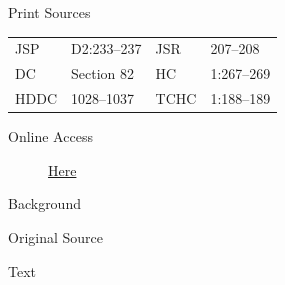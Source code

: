 			\begin{description}
				\item[Print Sources]
			\end{description}

				\begin{tabular}{p{0.5in}p{1in}p{0.5in}p{1in}}
				JSP	 	& D2:233--237	& JSR 		& 207--208 \\
				DC	 	& Section 82 	& HC 		& 1:267--269 \\
				HDDC 	& 1028--1037	& TCHC 		& 1:188--189 \\
				\end{tabular}
			
			\begin{description}
				\item[Online Access] \href{https://www.josephsmithpapers.org/paper-summary/revelation-26-april-1832-dc-82/1}{Here}
			\end{description}
			
			\begin{description}
				\item[Background]
			\end{description}
			
			
			\begin{description}
				\item[Original Source]
			\end{description}
			
			
			\begin{description}
				\item[Text]
			\end{description}
			
